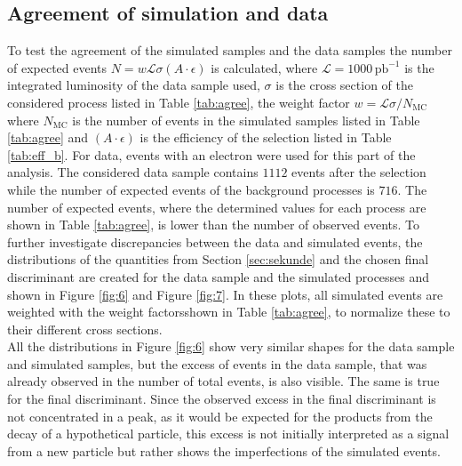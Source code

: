 \subsection{Agreement of simulation and data}
To test the agreement of the simulated samples and the data samples the number of expected events $N = w \mathcal{L} \sigma (A \cdot \epsilon)$ is calculated,
where $\mathcal{L} = 1000 \, \si{\pico\barn\tothe{-1}}$ is the integrated luminosity of the data sample used, $\sigma$ is the cross section of the considered
process listed in Table \ref{tab:agree}, the weight factor $w = \mathcal{L} \sigma / N_\text{MC}$ where $N_\text{MC}$ is the number of events in the
simulated samples listed in Table \ref{tab:agree} and $(A \cdot \epsilon)$ is the efficiency of the selection listed in Table \ref{tab:eff_b}.
For data, events with an electron were used for this part of the analysis.
The considered data sample contains $1112$ events after the selection while the number of expected events of the background processes is $716$.
The number of expected events, where the determined values for each process are shown in Table \ref{tab:agree}, is lower than the number of observed events.
To further investigate discrepancies between the data and simulated events, the distributions of the quantities from Section \ref{sec:sekunde} and the
chosen final discriminant are created for the data sample and the simulated processes and shown in Figure \ref{fig:6} and Figure \ref{fig:7}.
In these plots, all simulated events are weighted with the weight factorsshown in Table \ref{tab:agree}, to normalize these to their different cross 
sections.\\
All the distributions in Figure \ref{fig:6} show very similar shapes for the data sample and simulated samples, but the excess of events in the
data sample, that was already observed in the number of total events, is also visible. The same is true for the final discriminant.
Since the observed excess in the final discriminant is not concentrated in a peak, as it would be expected for the products from the
decay of a hypothetical particle, this excess is not initially interpreted as a signal from a new particle but rather shows the imperfections 
of the simulated events.


